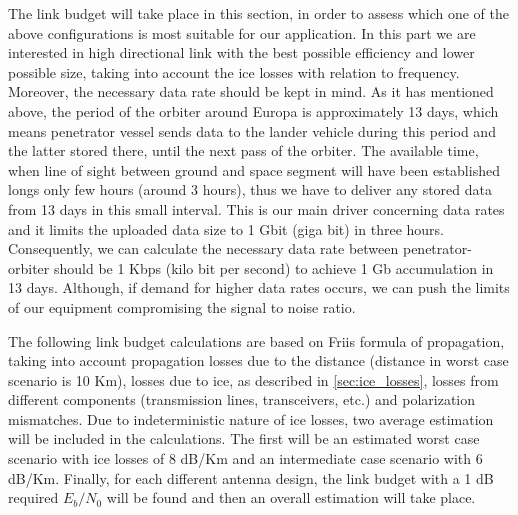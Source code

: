 The link budget will take place in this section, in order to assess which one of the above configurations is most suitable for our application. In this part we are interested in high directional link with the best possible efficiency and lower possible size, taking into account the ice losses with relation to frequency. Moreover, the necessary data rate should be kept in mind. As it has mentioned above, the period of the orbiter around Europa is approximately 13 days, which means penetrator vessel sends data to the lander vehicle during this period and the latter stored there, until the next pass of the orbiter. The available time, when line of sight between ground and space segment will have been established longs only few hours (around 3 hours), thus we have to deliver any stored data from 13 days in this small interval. This is our main driver concerning data rates and it limits the uploaded data size to 1 Gbit (giga bit) in three hours. Consequently, we can calculate the necessary data rate between penetrator-orbiter should be 1 Kbps (kilo bit per second) to achieve 1 Gb accumulation in 13 days. Although, if demand for higher data rates occurs, we can push the limits of our equipment compromising the signal to noise ratio.

The following link budget calculations are based on Friis formula of propagation, taking into account propagation losses due to the distance (distance in worst case scenario is 10 Km), losses due to ice, as described in \ref{sec:ice_losses}, losses from different components (transmission lines, transceivers, etc.) and polarization mismatches. Due to indeterministic nature of ice losses, two average estimation will be included in the calculations. The first will be an estimated worst case scenario with ice losses of 8 dB/Km and an intermediate case scenario with 6 dB/Km. Finally, for each different antenna design, the link budget with a 1 dB required $E_{b}/N_{0}$ will be found and then an overall estimation will take place. 

